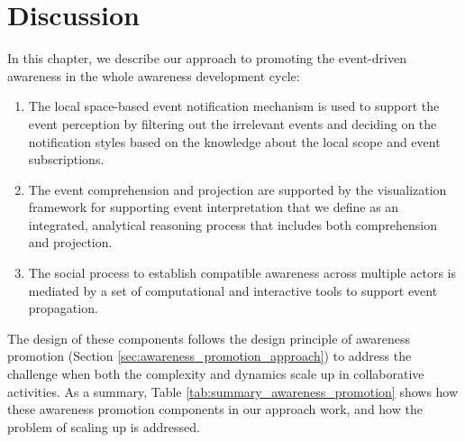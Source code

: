 \clearpage
\section{Discussion} %
\label{sec:discussion}
In this chapter, we describe our approach to promoting the event-driven awareness in the whole awareness development cycle:

\begin{enumerate}
	\item The local space-based event notification mechanism is used to support the event perception by filtering out the irrelevant events and deciding on the notification styles based on the knowledge about the local scope and event subscriptions.
	\item The event comprehension and projection are supported by the visualization framework for supporting event interpretation that we define as an integrated, analytical reasoning process that includes both comprehension and projection.
	\item The social process to establish compatible awareness across multiple actors is mediated by a set of computational and interactive tools to support event propagation.
\end{enumerate}

The design of these components follows the design principle of awareness promotion (Section \ref{sec:awareness_promotion_approach}) to address the challenge when both the complexity and dynamics scale up in collaborative activities. As a summary, Table \ref{tab:summary_awareness_promotion} shows how these awareness promotion components in our approach work, and how the problem of scaling up is addressed.

